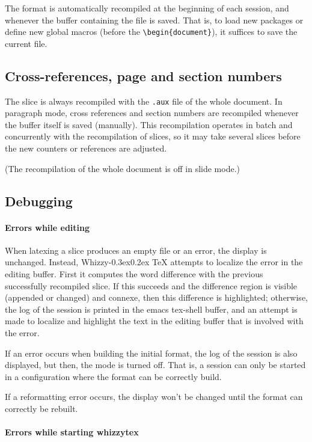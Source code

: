 \documentclass{article}
\let \lst \verb
\def \whizzy{{Whizzy\kern -0.3ex\raise 0.2ex \hbox{\TeX}}}
\begin{document}
The format is automatically recompiled at the beginning of each session, and
whenever the buffer containing the file is saved. That is, to load new
packages or define new global macros (before the \lst"\begin{document}"), it
suffices to save the current file.

\subsection {Cross-references, page and section numbers} 

The slice is always recompiled with the \lst".aux" file of the whole
document.  In paragraph mode, cross references and section numbers are 
recompiled whenever the buffer itself is saved (manually). 
This recompilation operates in batch and concurrently with the recompilation
of slices, so it may take several slices before the new counters or
references are adjusted.

(The recompilation of the whole document is off in slide mode.) 


\subsection {Debugging} 

\paragraph {Errors while editing}

When  latexing a slice produces an empty file or an error, the display is
unchanged. Instead, {\whizzy} attempts to localize the error in the editing
buffer. First it computes the word difference with the previous successfully
recompiled slice. If this succeeds and the difference region is visible
(appended or changed) and connexe, then this difference  is highlighted;
otherwise, the log of the session is printed in the emacs tex-shell buffer, 
and an attempt is made to localize and highlight the text in the editing
buffer that is involved with the error.


If an error occurs when building the initial format, the log of the session
is also displayed, but then, the mode is turned off. That is, a session can
only be started in a configuration where the format can be correctly build. 

If a reformatting error occurs, the display won't be changed until the format
can correctly be rebuilt.

\paragraph {Errors while starting whizzytex}


\end{document}
\end{document}
